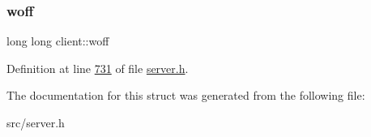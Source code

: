 \subsubsection{\texorpdfstring{woff}{woff}}
{\footnotesize\ttfamily long long client\+::woff}



Definition at line \hyperlink{server_8h_source_l00731}{731} of file \hyperlink{server_8h_source}{server.\+h}.



The documentation for this struct was generated from the following file\+:\begin{DoxyCompactItemize}
\item 
src/server.\+h\end{DoxyCompactItemize}
